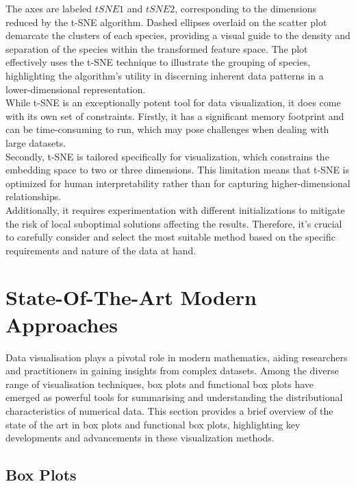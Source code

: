\documentclass{article}\usepackage[]{graphicx}\usepackage[]{xcolor}
\numberwithin{equation}{section}
\begin{document}
{\noindent
The axes are labeled $tSNE1$ and $tSNE2$, corresponding to the dimensions reduced by the t-SNE algorithm. Dashed ellipses overlaid on the scatter plot demarcate the clusters of each species, providing a visual guide to the density and separation of the species within the transformed feature space. The plot effectively uses the t-SNE technique to illustrate the grouping of species, highlighting the algorithm's utility in discerning inherent data patterns in a lower-dimensional representation.\\

\noindent
While t-SNE is an exceptionally potent tool for data visualization, it does come with its own set of constraints. Firstly, it has a significant memory footprint and can be time-consuming to run, which may pose challenges when dealing with large datasets.\\

\noindent
Secondly, t-SNE is tailored specifically for visualization, which constrains the embedding space to two or three dimensions. This limitation means that t-SNE is optimized for human interpretability rather than for capturing higher-dimensional relationships.\\

\noindent
Additionally, it requires experimentation with different initializations to mitigate the risk of local suboptimal solutions affecting the results. Therefore, it's crucial to carefully consider and select the most suitable method based on the specific requirements and nature of the data at hand.\\

\newpage 

\section{State-Of-The-Art Modern Approaches}
Data visualisation plays a pivotal role in modern mathematics, aiding researchers and practitioners in gaining insights from complex datasets. Among the diverse range of visualisation techniques, box plots and functional box plots have emerged as powerful tools for summarising and understanding the distributional characteristics of numerical data. This section provides a brief overview of the state of the art in box plots and functional box plots, highlighting key developments and advancements in these visualization methods.

\subsection{Box Plots}

}
\end{document}
